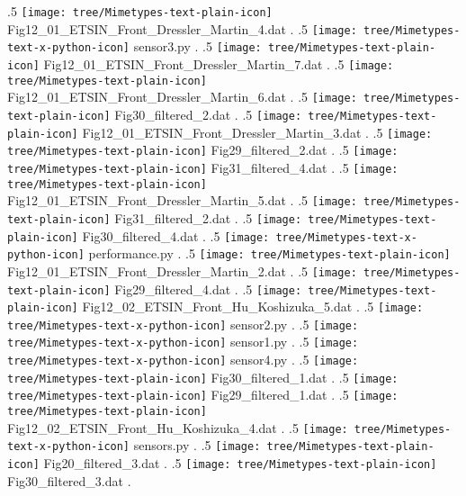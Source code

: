 {.5 { \texttt{[image: tree/Mimetypes-text-plain-icon]} Fig12\_01\_ETSIN\_Front\_Dressler\_Martin\_4.dat }.
.5 { \texttt{[image: tree/Mimetypes-text-x-python-icon]} sensor3.py }.
.5 { \texttt{[image: tree/Mimetypes-text-plain-icon]} Fig12\_01\_ETSIN\_Front\_Dressler\_Martin\_7.dat }.
.5 { \texttt{[image: tree/Mimetypes-text-plain-icon]} Fig12\_01\_ETSIN\_Front\_Dressler\_Martin\_6.dat }.
.5 { \texttt{[image: tree/Mimetypes-text-plain-icon]} Fig30\_filtered\_2.dat }.
.5 { \texttt{[image: tree/Mimetypes-text-plain-icon]} Fig12\_01\_ETSIN\_Front\_Dressler\_Martin\_3.dat }.
.5 { \texttt{[image: tree/Mimetypes-text-plain-icon]} Fig29\_filtered\_2.dat }.
.5 { \texttt{[image: tree/Mimetypes-text-plain-icon]} Fig31\_filtered\_4.dat }.
.5 { \texttt{[image: tree/Mimetypes-text-plain-icon]} Fig12\_01\_ETSIN\_Front\_Dressler\_Martin\_5.dat }.
.5 { \texttt{[image: tree/Mimetypes-text-plain-icon]} Fig31\_filtered\_2.dat }.
.5 { \texttt{[image: tree/Mimetypes-text-plain-icon]} Fig30\_filtered\_4.dat }.
.5 { \texttt{[image: tree/Mimetypes-text-x-python-icon]} performance.py }.
.5 { \texttt{[image: tree/Mimetypes-text-plain-icon]} Fig12\_01\_ETSIN\_Front\_Dressler\_Martin\_2.dat }.
.5 { \texttt{[image: tree/Mimetypes-text-plain-icon]} Fig29\_filtered\_4.dat }.
.5 { \texttt{[image: tree/Mimetypes-text-plain-icon]} Fig12\_02\_ETSIN\_Front\_Hu\_Koshizuka\_5.dat }.
.5 { \texttt{[image: tree/Mimetypes-text-x-python-icon]} sensor2.py }.
.5 { \texttt{[image: tree/Mimetypes-text-x-python-icon]} sensor1.py }.
.5 { \texttt{[image: tree/Mimetypes-text-x-python-icon]} sensor4.py }.
.5 { \texttt{[image: tree/Mimetypes-text-plain-icon]} Fig30\_filtered\_1.dat }.
.5 { \texttt{[image: tree/Mimetypes-text-plain-icon]} Fig29\_filtered\_1.dat }.
.5 { \texttt{[image: tree/Mimetypes-text-plain-icon]} Fig12\_02\_ETSIN\_Front\_Hu\_Koshizuka\_4.dat }.
.5 { \texttt{[image: tree/Mimetypes-text-x-python-icon]} sensors.py }.
.5 { \texttt{[image: tree/Mimetypes-text-plain-icon]} Fig20\_filtered\_3.dat }.
.5 { \texttt{[image: tree/Mimetypes-text-plain-icon]} Fig30\_filtered\_3.dat }.
}
